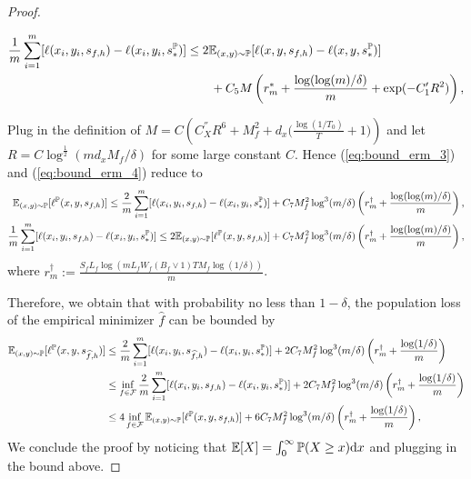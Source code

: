 \documentclass[11pt]{article}
\numberwithin{equation}{section}
\renewcommand{\P}{\mathbb{P}}
\renewcommand{\eqref}[1]{(\ref{#1})}
\begin{document}
\begin{proof}
\begin{equation}
\begin{aligned}
        \end{aligned}
    \end{equation}
    \begin{equation}\label{eq:bound_erm_4}
        \begin{aligned}
            \frac{1}{m}\sum_{i=1}^m [\ell(x_i,y_i,s_{f,h})-\ell(x_i,y_i,s_*^\P)]
            &\leq 2\E_{(x,y)\sim\P} [\ell(x,y,s_{f,h})-\ell(x,y,s_*^\P)] \\
            &\qquad + C_5M\left(r_m^*+\frac{\log(\log(m)/\delta)}{m}+\exp(-C_1'R^2)\right), \\
        \end{aligned}
    \end{equation}
    
    Plug in the definition of $M=C\left(C_X^{''}R^6+M_f^2+d_x\Big(\frac{\log(1/T_0)}{T}+1\Big)\right)$ and let $R=C\log^{\frac{1}{2}}(md_xM_f/\delta)$ for some large constant $C$. Hence \eqref{eq:bound_erm_3} and \eqref{eq:bound_erm_4} reduce to
    \begin{align}
        \E_{(x,y)\sim\P} [\ell^\P(x,y,s_{f,h})]
        \leq \frac{2}{m}\sum_{i=1}^m [\ell(x_i,y_i,s_{f,h})-\ell(x_i,y_i,s_*^\P)] + C_7M_f^2\log^3(m/\delta)\left(r_m^\dagger+\frac{\log(\log(m)/\delta)}{m}\right), \\
        \frac{1}{m}\sum_{i=1}^m [\ell(x_i,y_i,s_{f,h})-\ell(x_i,y_i,s_*^\P)]
        \leq 2\E_{(x,y)\sim\P} [\ell^\P(x,y,s_{f,h})] + C_7M_f^2\log^3(m/\delta)\left(r_m^\dagger+\frac{\log(\log(m)/\delta)}{m}\right),
    \end{align}
    where $r_m^\dagger:=\frac{S_fL_f\log\left(mL_fW_f(B_f\vee 1)TM_f\log(1/\delta)\right)}{m}$.

    Therefore, we obtain that with probability no less than $1-\delta$, the population loss of the empirical minimizer $\widehat{f}$ can be bounded by
    \begin{equation}
        \begin{aligned}
            \E_{(x,y)\sim\P}[\ell^\P(x,y,s_{\widehat{f},h})]
            &\leq \frac{2}{m}\sum_{i=1}^m [\ell(x_i,y_i,s_{\widehat{f},h})-\ell(x_i,y_i,s_*^\P)] + 2C_7M_f^2\log^3(m/\delta)\left(r_m^\dagger+\frac{\log(1/\delta)}{m}\right) \\
            &\leq \inf_{f\in\mathcal{F}}\frac{2}{m}\sum_{i=1}^m [\ell(x_i,y_i,s_{f,h})-\ell(x_i,y_i,s_*^\P)] + 2C_7M_f^2\log^3(m/\delta)\left(r_m^\dagger+\frac{\log(1/\delta)}{m}\right) \\
            &\leq 4\inf_{f\in\mathcal{F}}\E_{(x,y)\sim\P}[\ell^\P(x,y,s_{f,h})] + 6C_7M_f^2\log^3(m/\delta)\left(r_m^\dagger+\frac{\log(1/\delta)}{m}\right),
        \end{aligned}
    \end{equation}
    We conclude the proof by noticing that $\E[X]=\int_0^\infty\P(X\geq x)\dif x$ and plugging in the bound above.
\end{proof}
\end{document}
